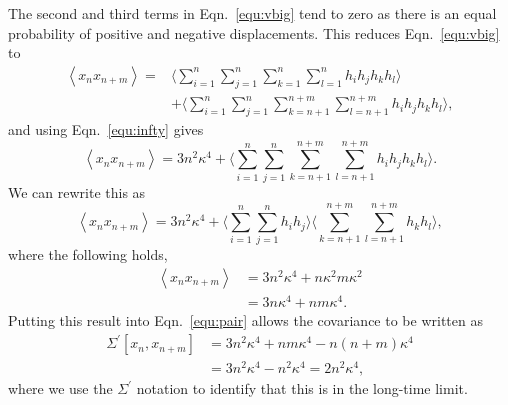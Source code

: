 \documentclass[reprint,superscriptaddress,nobibnotes,amsmath,amssymb,aps,prx,hidelinks,linenumbers]{revtex4-2}
\newcommand{\oMSDn}{\ensuremath{x_n}}
\newcommand{\oMSDm}{\ensuremath{x_{n + m}}}
\begin{document}
The second and third terms in Eqn.~\ref{equ:vbig} tend to zero as there is an equal probability of positive and negative displacements. 
This reduces Eqn.~\ref{equ:vbig} to 
\begin{equation}
    \begin{aligned}
        \left<\oMSDn\oMSDm\right> = & \Bigg\langle \sum_{i=1}^n\sum_{j=1}^n\sum_{k=1}^{n}\sum_{l=1}^{n} h_i h_j h_k h_l \Bigg\rangle \\
        & + \Bigg\langle \sum_{i=1}^n\sum_{j=1}^n\sum_{k=n+1}^{n+m}\sum_{l=n+1}^{n+m} h_i h_j h_k h_l \Bigg\rangle, 
    \end{aligned}
\end{equation}
and using Eqn.~\ref{equ:infty} gives
\begin{equation}
    \left<\oMSDn\oMSDm\right> = 3n^2\kappa^4 + \Bigg\langle \sum_{i=1}^n\sum_{j=1}^n\sum_{k=n+1}^{n+m}\sum_{l=n+1}^{n+m} h_i h_j h_k h_l \Bigg\rangle.
\end{equation}
We can rewrite this as
\begin{equation}
    \left<\oMSDn\oMSDm\right> = 3n^2\kappa^4 + \Bigg\langle \sum_{i=1}^n\sum_{j=1}^n h_i h_j \Bigg\rangle \Bigg\langle \sum_{k=n+1}^{n+m}\sum_{l=n+1}^{n+m} h_k h_l \Bigg\rangle,
\end{equation}
where the following holds,
\begin{equation}
    \begin{aligned}
        \left<\oMSDn\oMSDm\right> &= 3n^2\kappa^4 + n\kappa^2 m\kappa^2 \\
                                  &= 3n\kappa^4 + nm\kappa^4.
    \end{aligned}
\end{equation}
Putting this result into Eqn.~\ref{equ:pair} allows the covariance to be written as
\begin{equation}
    \begin{aligned}
    \Sigma^\prime \left[\oMSDn, \oMSDm \right] &= 3n^2\kappa^4 + nm\kappa^4 - n(n+m)\kappa^4 \\
                                        &= 3n^2\kappa^4 - n^2\kappa^4 = 2n^2\kappa^4,
    \end{aligned}
    \label{equ:cov_der}
\end{equation}
where we use the $\Sigma^\prime$ notation to identify that this is in the long-time limit. 
\end{document}
